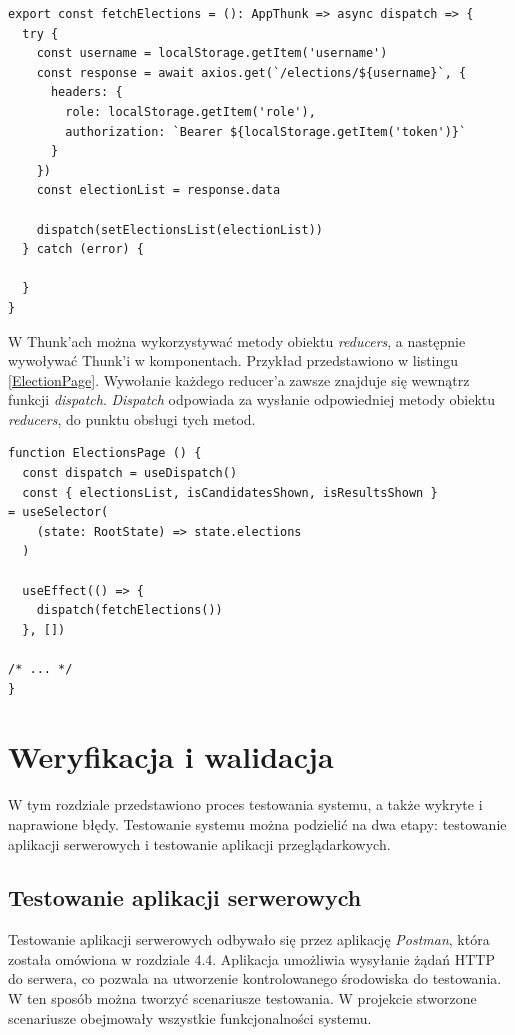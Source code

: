 \documentclass[a4paper,12pt]{book}
\begin{document}
\begin{lstlisting}[style=ES6, caption={Thunk \textit{fetchElection}.}, label={fetch}]
export const fetchElections = (): AppThunk => async dispatch => {
  try {
    const username = localStorage.getItem('username')
    const response = await axios.get(`/elections/${username}`, {
      headers: {
        role: localStorage.getItem('role'),
        authorization: `Bearer ${localStorage.getItem('token')}`
      }
    })
    const electionList = response.data

    dispatch(setElectionsList(electionList))
  } catch (error) {

  }
}
\end{lstlisting}

W Thunk'ach można wykorzystywać metody obiektu \textit{reducers}, a następnie wywoływać Thunk'i w komponentach. Przykład przedstawiono w listingu \ref{ElectionPage}. Wywołanie każdego reducer'a zawsze znajduje się wewnątrz funkcji \textit{dispatch}. \textit{Dispatch} odpowiada za wysłanie odpowiedniej metody obiektu \textit{reducers}, do punktu obsługi tych metod.

\begin{lstlisting}[style=ES6, caption={Wykorzystanie Thunk'a, w komponencie \textit{ElectionsPage}.}, label={ElectionPage}]
function ElectionsPage () {
  const dispatch = useDispatch()
  const { electionsList, isCandidatesShown, isResultsShown } 
= useSelector(
    (state: RootState) => state.elections
  )

  useEffect(() => {
    dispatch(fetchElections())
  }, [])

/* ... */
}
\end{lstlisting}

\chapter{Weryfikacja i walidacja}

W tym rozdziale przedstawiono proces testowania systemu, a także wykryte i naprawione błędy. Testowanie systemu można podzielić na dwa etapy: testowanie aplikacji serwerowych i testowanie aplikacji przeglądarkowych. 

\section{Testowanie aplikacji serwerowych}

Testowanie aplikacji serwerowych odbywało się przez aplikację \textit{Postman}, która została omówiona w rozdziale 4.4. Aplikacja umożliwia wysyłanie żądań HTTP do serwera, co pozwala na utworzenie kontrolowanego środowiska do testowania. W ten sposób można tworzyć scenariusze testowania. W projekcie stworzone scenariusze obejmowały wszystkie funkcjonalności systemu.
 
\end{document}
